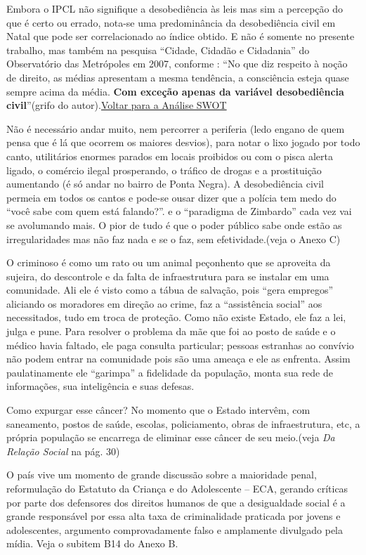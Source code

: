 \documentclass[
	12pt,				%
	openright,			%
	twoside,			%
	a4paper,			%
	chapter=TITLE,		%
	section=TITLE,		%
	subsection=TITLE,	%
	subsubsection=TITLE,%
	spanish,            %
	english,			%
	brazil				%
	]{abntex2}
\begin{document}
\hypertarget{CA2}{}
\par
Embora o IPCL não signifique a desobediência às leis mas sim a percepção do que é certo ou errado, nota-se uma predominância da desobediência civil em Natal que pode ser correlacionado ao índice obtido. E não é somente no presente trabalho, mas também na pesquisa “Cidade, Cidadão e Cidadania” do Observatório das Metrópoles em 2007, conforme : “No que diz respeito à noção de direito, as médias apresentam a mesma tendência, a consciência esteja quase sempre acima da média. \textbf{Com exceção apenas da variável desobediência civil}”(grifo do autor).\hyperlink{T1}{Voltar para a Análise SWOT}
\par
Não é necessário andar muito, nem percorrer a periferia (ledo engano de quem pensa que é lá que ocorrem os maiores desvios), para notar o lixo jogado por todo canto, utilitários enormes parados em locais proibidos ou com o pisca alerta ligado, o comércio ilegal prosperando, o tráfico de drogas e a prostituição aumentando (é só andar no bairro de Ponta Negra). A desobediência civil permeia em todos os cantos e pode-se ousar dizer que a polícia tem medo do “você sabe com quem está falando?”. e o “paradigma de Zimbardo” cada vez vai se avolumando mais. O pior de tudo é que o poder público sabe onde estão as irregularidades mas não faz nada e se o faz, sem efetividade.(veja o Anexo C)
\par
O criminoso é como um rato ou um animal peçonhento que se aproveita da sujeira, do descontrole e da falta de infraestrutura para se instalar em uma comunidade. Ali ele é visto como a tábua de salvação, pois “gera empregos” aliciando os moradores em direção ao crime, faz a “assistência social” aos necessitados, tudo em troca de proteção. Como não existe Estado, ele faz a lei, julga e pune. Para resolver o problema da mãe que foi ao posto de saúde e o médico havia faltado, ele paga consulta particular; pessoas estranhas ao convívio não podem entrar na comunidade pois são uma ameaça e ele as enfrenta. Assim paulatinamente ele “garimpa” a fidelidade da população, monta sua rede de informações, sua inteligência e suas defesas.
\par
Como expurgar esse câncer? No momento que o Estado intervêm, com saneamento, postos de saúde, escolas, policiamento, obras de infraestrutura, etc, a própria população se encarrega de eliminar esse câncer de seu meio.(veja \textit{Da Relação Social} na pág. 30)
\par
O país vive um momento de grande discussão sobre a maioridade penal, reformulação do Estatuto da Criança e do Adolescente – ECA, gerando críticas por parte dos defensores dos direitos humanos de que a desigualdade social é a grande responsável por essa alta taxa de criminalidade praticada por jovens e adolescentes, argumento comprovadamente falso e amplamente divulgado pela mídia. Veja o subitem B14 do Anexo B.
\end{document}
